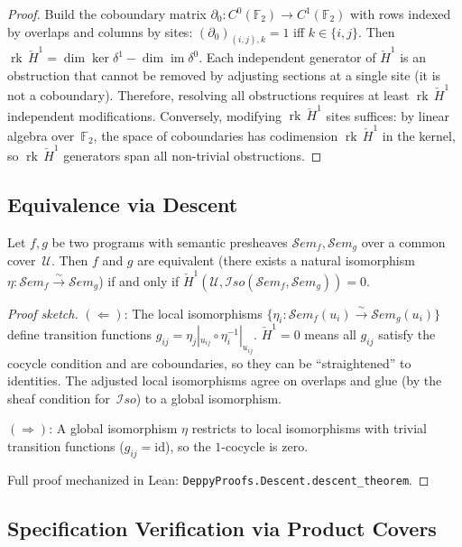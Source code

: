 \documentclass[acmsmall,screen]{acmart}
\theoremstyle{remark}
\newcommand{\Sem}{\mathcal{S}\mathit{em}}
\newcommand{\Hc}[1]{\check{H}^{#1}}
\newcommand{\Iso}{\mathcal{I}\mathit{so}}
\newcommand{\rk}{\operatorname{rk}}
\newcommand{\im}{\operatorname{im}}
\newcommand{\GF}{\mathbb{F}}
\begin{document}
\begin{proof}
Build the coboundary matrix $\partial_0 : C^0(\GF_2) \to C^1(\GF_2)$
with rows indexed by overlaps and columns by sites:
$(\partial_0)_{(i,j),k} = 1$ iff $k \in \{i,j\}$.
Then $\rk\,\Hc{1} = \dim\ker\delta^1 - \dim\im\delta^0$.
Each independent generator of $\Hc{1}$ is an obstruction that cannot
be removed by adjusting sections at a single site (it is not a
coboundary).  Therefore, resolving all obstructions requires at least
$\rk\,\Hc{1}$ independent modifications.  Conversely, modifying
$\rk\,\Hc{1}$ sites suffices: by linear algebra over~$\GF_2$,
the space of coboundaries has codimension $\rk\,\Hc{1}$ in the
kernel, so $\rk\,\Hc{1}$ generators span all non-trivial
obstructions.
\end{proof}

\subsection{Equivalence via Descent}\label{sec:equiv}

\begin{theorem}\label{thm:descent}
Let $f, g$ be two programs with semantic presheaves $\Sem_f, \Sem_g$
over a common cover~$\mathcal{U}$.  Then $f$ and $g$ are equivalent
(there exists a natural isomorphism $\eta : \Sem_f \xrightarrow{\sim}
\Sem_g$) if and only if $\Hc{1}(\mathcal{U}, \Iso(\Sem_f, \Sem_g)) = 0$.
\end{theorem}

\begin{proof}[Proof sketch]
$(\Leftarrow)$: The local isomorphisms $\{\eta_i : \Sem_f(u_i)
\xrightarrow{\sim} \Sem_g(u_i)\}$ define transition functions
$g_{ij} = \eta_j|_{u_{ij}} \circ \eta_i^{-1}|_{u_{ij}}$.
$\Hc{1} = 0$ means all $g_{ij}$ satisfy the cocycle condition and are
coboundaries, so they can be ``straightened'' to identities.  The
adjusted local isomorphisms agree on overlaps and glue (by the sheaf
condition for~$\Iso$) to a global isomorphism.

$(\Rightarrow)$: A global isomorphism $\eta$ restricts to local
isomorphisms with trivial transition functions ($g_{ij} = \mathrm{id}$),
so the $1$-cocycle is zero.

Full proof mechanized in Lean: \texttt{DeppyProofs.Descent.descent\_theorem}.
\end{proof}

\subsection{Specification Verification via Product Covers}%
\label{sec:spec}
\end{document}
